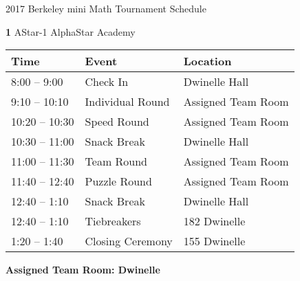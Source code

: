 \documentclass[12pt]{amsart}
\begin{document}
\renewcommand\arraystretch{3.5}

\newcommand{\TeamID}{1}
\newcommand{\TeamName}{AStar-1}
\newcommand{\SchoolName}{AlphaStar Academy}
\newcommand{\Room}{}

\begin{center}
{\sc \Large 2017 Berkeley mini Math Tournament Schedule}


\bigskip


{\bf \Large  \TeamID} \hfill {\large \TeamName} \hfill {\large \SchoolName}

\bigskip
\bigskip

\begin{tabular}{| p{} | p{} | p{} |}
\hline
\bf Time       & \bf Event               & \bf Location               \\ \hline
8:00 -- 9:00   & Check In            & Dwinelle Hall       \\ \hline
9:10 -- 10:10  & Individual Round     &  Assigned Team Room        \\ \hline
10:20 -- 10:30 & Speed Round           & Assigned Team Room         \\ \hline
10:30 -- 11:00 & Snack Break            & Dwinelle Hall     \\ \hline
11:00 -- 11:30 & Team Round    &  Assigned Team Room       \\ \hline
11:40 -- 12:40 & Puzzle Round      &  Assigned Team Room       \\ \hline
12:40 -- 1:10  & Snack Break & Dwinelle Hall  \\ \hline
12:40 -- 1:10  & Tiebreakers & 182 Dwinelle                \\ \hline
1:20 -- 1:40   & Closing Ceremony    & 155 Dwinelle      \\ \hline
\end{tabular} 
\end{center}

\vspace{0.5in}

{\bf \large Assigned Team Room: \qquad\qquad Dwinelle}


\newpage



\renewcommand{\TeamID}{2}
\renewcommand{\TeamName}{AStar-2}
\renewcommand{\SchoolName}{AlphaStar Academy}
\renewcommand{\Room}{}
\end{document}
